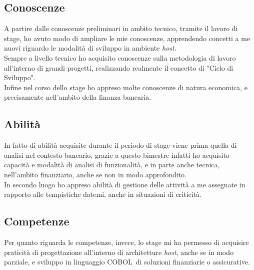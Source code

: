 
\subsection{Conoscenze}

A partire dalle conoscenze preliminari in ambito tecnico, tramite il lavoro di stage, ho avuto modo di ampliare le mie conoscenze, apprendendo concetti a me nuovi riguardo le modalità di sviluppo in ambiente \textit{host}.\\

Sempre a livello tecnico ho acquisito conoscenze sulla metodologia di lavoro all'interno di grandi progetti, realizzando realmente il concetto di "Ciclo di Sviluppo".\\

Infine nel corso dello stage ho appreso molte conoscenze di natura economica, e precisamente nell'ambito della finanza bancaria.

\subsection{Abilità}

In fatto di abilità acquisite durante il periodo di stage viene prima quella di analisi nel contesto bancario, grazie a questo bimestre infatti ho acquisito capacità e modalità di analisi di funzionalità, e in parte anche tecnica, nell'ambito finanziario, anche se non in modo approfondito.\\

In secondo luogo ho appreso abilità di gestione delle attività a me assegnate in rapporto alle tempistiche datemi, anche in situazioni di criticità.


\subsection{Competenze}

Per quanto riguarda le competenze, invece, lo stage mi ha permesso di acquisire praticità di progettazione all'interno di architetture \textit{host}, anche se in modo parziale, e sviluppo in linguaggio COBOL\glossario\ di soluzioni finanziarie o assicurative.\\

